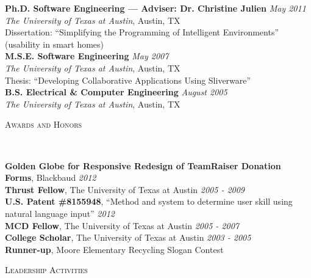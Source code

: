 \documentclass[9pt]{article}
\newenvironment{changemargin}[2]{%
  \begin{list}{}{%
    \setlength{\topsep}{0pt}%
    \setlength{\leftmargin}{#1}%
    \setlength{\rightmargin}{#2}%
    \setlength{\listparindent}{\parindent}%
    \setlength{\itemindent}{\parindent}%
    \setlength{\parsep}{\parskip}%
  }%
  \item[]}{\end{list}
}
\newcommand{\lineover}{
	\begin{changemargin}{-0.05in}{-0.05in}
		\vspace*{-8pt}
		\hrulefill \\
		\vspace*{-2pt}
	\end{changemargin}
}
\newcommand{\header}[1]{
	\begin{changemargin}{-0.5in}{-0.5in}
		\scshape{#1}\\
  	\lineover
	\end{changemargin}
}
\newenvironment{body} {
	\vspace*{-16pt}
	\begin{changemargin}{-0.25in}{-0.5in}
  }	
	{\end{changemargin}
}
\begin{document}
\begin{body}
	\vspace{14pt}
	\textbf{Ph.D. Software Engineering --- Adviser: Dr. Christine Julien}{} \hfill \emph{May 2011}{} \\
	\emph{The University of Texas at Austin}, Austin, TX{} \\
	Dissertation: ``Simplifying the Programming of Intelligent Environments'' (usability in smart homes)\\
  \medskip
	\textbf{M.S.E. Software Engineering}{} \hfill \emph{May 2007}{} \\
	\emph{The University of Texas at Austin}, Austin, TX{} \\
	Thesis: ``Developing Collaborative Applications Using Sliverware''\\
  \medskip
	\textbf{B.S. Electrical \& Computer Engineering} \hfill \emph{August 2005} \\
	\emph{The University of Texas at Austin}, Austin, TX\\
\end{body}

\medskip


\header{Awards and Honors}

\begin{body}
	\vspace{14pt}
	\textbf{Golden Globe for Responsive Redesign of TeamRaiser Donation Forms}, Blackbaud \hfill{} \emph{2012}\\
	\medskip
	\textbf{Thrust Fellow}, The University of Texas at Austin \hfill{} \emph{2005 - 2009}\\
	\medskip
	\textbf{U.S. Patent \#8155948}, ``Method and system to determine user skill using natural language input'' \hfill{} \emph{2012} \\ 
	\medskip
	\textbf{MCD Fellow}, The University of Texas at Austin \hfill{} \emph{2005 - 2007}\\
	\medskip
	\textbf{College Scholar}, The University of Texas at Austin \hfill{} \emph{2003 - 2005}\\
	\medskip
	\textbf{Runner-up}, Moore Elementary Recycling Slogan Contest
\end{body}

\medskip


\header{Leadership Activities}
\end{document}
